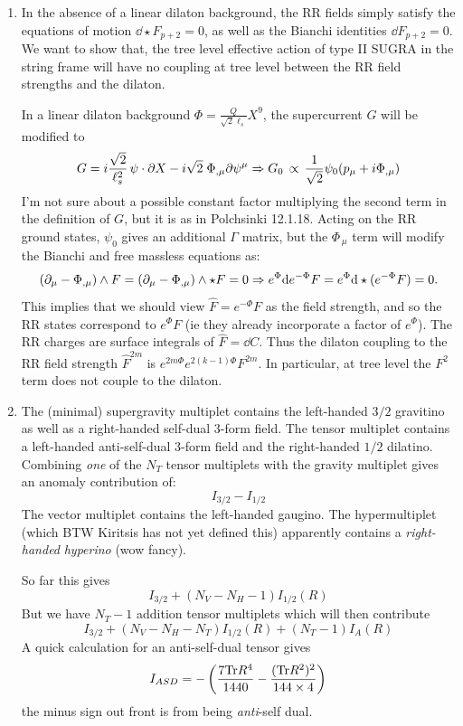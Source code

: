 \documentclass[11pt, class=article, crop=false]{standalone}
\begin{document}
\begin{enumerate}
	\item In the absence of a linear dilaton background, the RR fields simply satisfy the equations of motion $\dd \star F_{p+2} = 0$, as well as the Bianchi identities $\dd F_{p+2} = 0$. We want to show that, the tree level effective action of type II SUGRA in the string frame will have no coupling at tree level between the RR field strengths and the dilaton.
	
	In a linear dilaton background $\Phi = \frac{Q}{\sqrt{2} \ell_s} X^9$, the supercurrent $G$ will be modified to
	\[
		G= i \frac{\sqrt 2}{\ell_s^2}\,\psi \cdot \partial X  - i \sqrt 2\;  \Phi_{,\mu} \partial \psi^\mu \Rightarrow G_0 \, \propto \, \frac{1}{\sqrt 2} \psi_0 (p_\mu + i \Phi_{, \mu})
	\]
	I'm not sure about a possible constant factor multiplying the second term in the definition of $G$, but it is as in Polchsinki 12.1.18. Acting on the RR ground states, $\psi_0$ gives an additional $\Gamma$ matrix, but the $\Phi_{\, \mu}$ term will modify the Bianchi and free massless equations as:
	\[
		(\partial_\mu -\Phi_{, \mu}) \wedge F = (\partial_\mu - \Phi_{, \mu}) \wedge \star F = 0 \Rightarrow e^{\Phi} \mathrm{d} e^{-\Phi} F = e^{\Phi} \mathrm{d} \star (e^{-\Phi} F) = 0.
	\]
	This implies that we should view $\hat F = e^{-\Phi} F$ as the field strength, and so the RR states correspond to $e^{\Phi} F$ (ie they already incorporate a factor of $e^{\Phi}$). The RR charges are surface integrals of $\hat F = \dd C$. Thus the dilaton coupling to the RR field strength $\hat F^{2m}$ is $e^{2m \Phi} e^{2 (k -1) \Phi} F^{2m}$. In particular, at tree level the $F^2$ term does not couple to the dilaton.
	
	\item The (minimal) supergravity multiplet contains  the left-handed $3/2$ gravitino as well as a right-handed self-dual 3-form field. The tensor multiplet contains a left-handed anti-self-dual 3-form field and the right-handed $1/2$ dilatino. Combining \emph{one} of the $N_T$ tensor multiplets with the gravity multiplet gives an anomaly contribution of:
	\[
		I_{3/2} - I_{1/2}
	\]
	The vector multiplet contains the left-handed gaugino. The hypermultiplet (which BTW Kiritsis has not yet defined this) apparently contains a \emph{right-handed} \emph{hyperino} (wow fancy). 
	
	So far this gives
	\[
		I_{3/2} + (N_V - N_H - 1) I_{1/2} (R)
	\]
	But we have $N_T - 1$ addition tensor multiplets which will then contribute
	\[
		I_{3/2} + (N_V - N_H - N_T) I_{1/2} (R) + (N_T - 1) I_A(R) 
	\]
	A quick calculation for an anti-self-dual tensor gives
	\[
		I_{ASD} = - \left( \frac{7 \mathrm{Tr} R^4}{1440} - \frac{(\mathrm{Tr} R^2)^2}{144 \times 4} \right)
	\]
	the minus sign out front is from being \emph{anti}-self dual. 
	

\end{enumerate}
\end{document}
